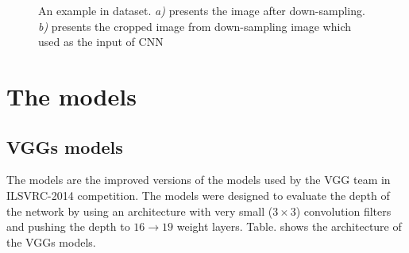 \documentclass[12pt,a4paper]{article}
\begin{document}
\begin{figure}[h!]
\centering
{}\hspace{1cm}
\caption{An example in dataset. \textit{a)} presents the image after down-sampling. \textit{b)} presents the cropped image from down-sampling image which used as the input of CNN}
\label{figdata}
\end{figure}
\section{The models}
\subsection{VGGs models}
The models are the improved versions of the models used by the VGG team in ILSVRC-2014 competition. The models were designed to evaluate the depth of the network by using an architecture with very small ($3 \times 3$) convolution filters and pushing the depth to $16 \to 19$ weight layers. Table. shows the architecture of the VGGs models.
\end{document}
